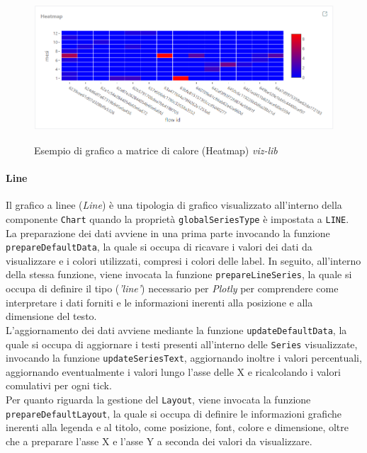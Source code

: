\begin{figure}[H]
    \centering
    \includegraphics[alt={Esempio di grafico a matrice di calore viz-lib}, width=1 \columnwidth, height=\maxdimen, keepaspectratio]{img/ex_heatmap.png}
    \caption{Esempio di grafico a matrice di calore (Heatmap) \textit{viz-lib}}
    \label{fig:heatmap-example}
\end{figure}

\paragraph{Line}
Il grafico a linee (\textit{Line}) è una tipologia di grafico visualizzato all'interno della componente \texttt{Chart} quando la proprietà \texttt{globalSeriesType} è impostata a \texttt{LINE}. \\
La preparazione dei dati avviene in una prima parte invocando la funzione \texttt{prepareDefaultData}, la quale si occupa di ricavare i valori dei dati da visualizzare e i colori utilizzati, compresi i
colori delle label. In seguito, all'interno della stessa funzione, viene invocata la funzione \texttt{prepareLineSeries}, la quale si occupa di definire il tipo (\textit{'line'}) necessario per \textit{Plotly}
per comprendere come interpretare i dati forniti e le informazioni inerenti alla posizione e alla dimensione del testo. \\
L'aggiornamento dei dati avviene mediante la funzione \texttt{updateDefaultData}, la quale si occupa di aggiornare i testi presenti all'interno delle \texttt{Series} visualizzate, invocando la funzione
\texttt{updateSeriesText}, aggiornando inoltre i valori percentuali, aggiornando eventualmente i valori lungo l'asse delle X e ricalcolando i valori comulativi per ogni tick. \\
Per quanto riguarda la gestione del \texttt{Layout}, viene invocata la funzione \texttt{prepareDefaultLayout}, la quale si occupa di definire le informazioni grafiche inerenti alla legenda e al titolo, come posizione,
font, colore e dimensione, oltre che a preparare l'asse X e l'asse Y a seconda dei valori da visualizzare.

